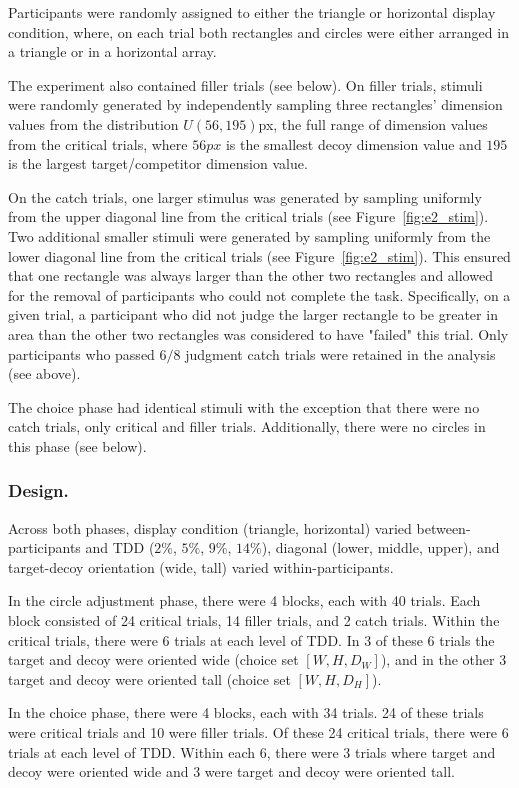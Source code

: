 Participants were randomly assigned to either the triangle or horizontal display condition, where, on each trial both rectangles and circles were either arranged in a triangle or in a horizontal array.

The experiment also contained filler trials (see below). On filler trials, stimuli were randomly generated by independently sampling three rectangles' dimension values from the distribution $U(56,195)$px, the full range of dimension values from the critical trials, where $56px$ is the smallest decoy dimension value and $195$ is the largest target/competitor dimension value.

On the catch trials, one larger stimulus was generated by sampling uniformly from the upper diagonal line from the critical trials (see Figure~\ref{fig:e2_stim}). Two additional smaller stimuli were generated by sampling uniformly from the lower diagonal line from the critical trials (see Figure~\ref{fig:e2_stim}). This ensured that one rectangle was always larger than the other two rectangles and allowed for the removal of participants who could not complete the task. Specifically, on a given trial, a participant who did not judge the larger rectangle to be greater in area than the other two rectangles was considered to have "failed" this trial. Only participants who passed $6/8$ judgment catch trials were retained in the analysis (see above).

The choice phase had identical stimuli with the exception that there were no catch trials, only critical and filler trials. Additionally, there were no circles in this phase (see below). 

\subsubsection{Design.}
Across both phases, display condition (triangle, horizontal) varied between-participants and TDD ($2\%$, $5\%$, $9\%$, $14\%$), diagonal (lower, middle, upper), and target-decoy orientation (wide, tall) varied within-participants. 

In the circle adjustment phase, there were 4 blocks, each with 40 trials. Each block consisted of 24 critical trials, 14 filler trials, and 2 catch trials. Within the critical trials, there were 6 trials at each level of TDD. In 3 of these 6 trials the target and decoy were oriented wide (choice set $[W,H,D_{W}]$), and in the other 3 target and decoy were oriented tall (choice set $[W,H,D_{H}]$). 

In the choice phase, there were 4 blocks, each with 34 trials. 24 of these trials were critical trials and 10 were filler trials. Of these 24 critical trials, there were 6 trials at each level of TDD. Within each 6, there were 3 trials where target and decoy were oriented wide and 3 were target and decoy were oriented tall. 

